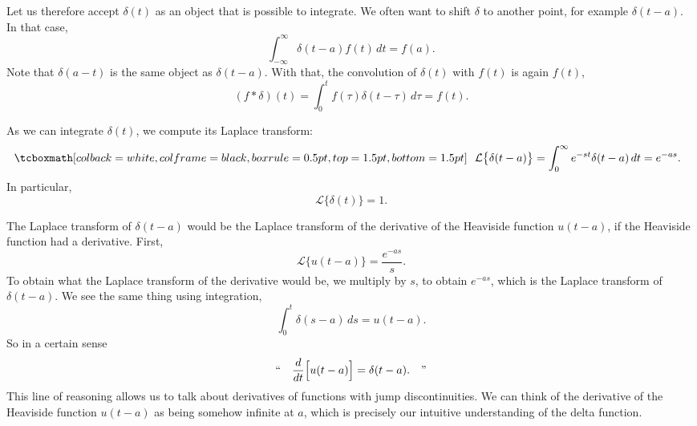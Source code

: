 Let us therefore accept $\delta(t)$ as an object that is possible to
integrate.  We often want to shift $\delta$ to another point, for example
$\delta(t-a)$.  In that case,
\begin{equation*}
\int_{-\infty}^\infty \delta(t-a) f(t) \,dt = f(a) .
\end{equation*}
Note that $\delta(a-t)$ is the same object as $\delta(t-a)$.
With that, the convolution of $\delta(t)$ with $f(t)$ is again $f(t)$,
\begin{equation*}
(f * \delta) (t) = 
\int_{0}^t f(\tau) \delta(t-\tau) \,d\tau
= f(t) .
\end{equation*}

As we can integrate $\delta(t)$, we compute its Laplace transform:
\begin{equation*}
\mybxbg{~~
{\mathcal{L}} \bigl\{ \delta(t-a) \bigr\}
=
\int_{0}^\infty e^{-st} \delta(t-a) \,dt = e^{-as} .
~~}
\end{equation*}
In particular,
\begin{equation*}
{\mathcal{L}} \bigl\{ \delta(t) \bigr\} = 1 .
\end{equation*}

\begin{remark} \label{remark:deltaderivofjump}
The Laplace transform of $\delta(t-a)$ would be 
the Laplace transform of the derivative of the Heaviside function
$u(t-a)$, if the Heaviside function had a derivative.
First,
\begin{equation*}
{\mathcal{L}} \bigl\{ u(t-a) \bigr\} = \frac{e^{-as}}{s}.
\end{equation*}
To obtain what the Laplace transform of the derivative would be,
we multiply by $s$, to obtain $e^{-as}$, which is the Laplace transform
of $\delta(t-a)$.
We see the same thing using integration,
\begin{equation*}
\int_0^t \delta(s-a)\,ds = u(t-a) .
\end{equation*}
So in a certain sense
\begin{equation*}
\text{``}
\quad \frac{d}{dt} \Bigl[ u(t-a) \Bigr] = \delta(t-a) . \quad
\text{''}
\end{equation*}
This line of reasoning allows us to talk about derivatives of functions with jump
discontinuities.
We can think of
the derivative of the Heaviside function $u(t-a)$ as being somehow infinite
at $a$, which is precisely our intuitive understanding of the delta
function.
\end{remark}

